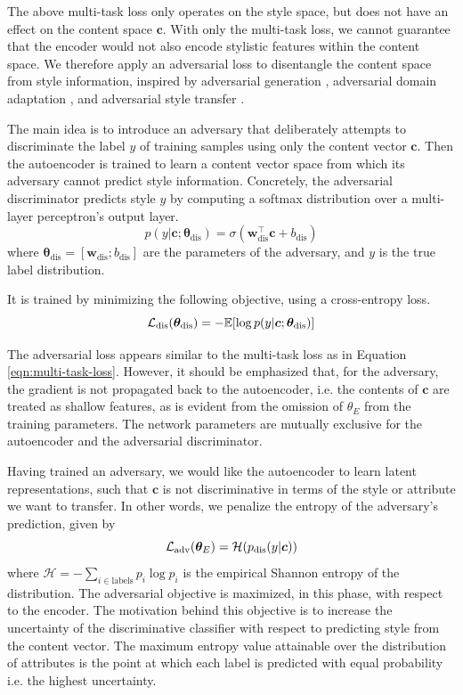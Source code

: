 The above multi-task loss only operates on the style space, but does not have an effect on the content space $\bm c$. With only the multi-task loss, we cannot guarantee that the encoder would not also encode stylistic features within the content space. We therefore apply an adversarial loss to disentangle the content space from style information, inspired by adversarial generation \citep{goodfellow2014generative}, adversarial domain adaptation \citep{liu2017adversarial}, and adversarial style transfer \citep{fu2017style}.

The main idea is to introduce an adversary that deliberately attempts to discriminate the label $y$ of training samples using only the content vector $\bm c$. Then the autoencoder is trained to learn a content vector space from which its adversary cannot predict style information. Concretely, the adversarial discriminator predicts style $y$ by computing a softmax distribution over a multi-layer perceptron's output layer.
\begin{equation}
	p(y | \bm c; \bm\theta_\text{dis}) = \sigma(\bm w_\text{dis}^\top \bm c + b_\text{dis})
\end{equation}
where $\bm\theta_\text{dis}=[\bm w_\text{dis}; b_\text{dis}]$ are the parameters of the adversary, and $y$ is the true label distribution.

It is trained by minimizing the following objective, using a cross-entropy loss.
\begin{equation} \label{eqn:adv-disc-loss}
	\mathcal{L}_\text{dis}(\bm\theta_\text{dis}) =
	- \mathbb{E} [\log p(y | \bm c; \bm\theta_\text{dis})]
\end{equation}

The adversarial loss appears similar to the multi-task loss as in Equation \ref{eqn:multi-task-loss}. However, it should be emphasized that, for the adversary, the gradient is not propagated back to the autoencoder, i.e. the contents of $\bm c$ are treated as shallow features, as is evident from the omission of $\theta_{E}$ from the training parameters. The network parameters are mutually exclusive for the autoencoder and the adversarial discriminator.

Having trained an adversary, we would like the autoencoder to learn latent representations, such that $\bm c$ is not discriminative in terms of the style or attribute we want to transfer. In other words, we penalize the entropy of the adversary's prediction, given by
\begin{equation}
	\mathcal{L}_\text{adv}(\bm\theta_E) = \mathcal{H}(p_\text{dis}(y | \bm c))
\end{equation}
where $\mathcal{H}=-\sum_{i\in\text{labels}} p_i\log p_i$ is the empirical Shannon entropy of the distribution. The adversarial objective is maximized, in this phase, with respect to the encoder. The motivation behind this objective is to increase the uncertainty of the discriminative classifier with respect to predicting style from the content vector. The maximum entropy value attainable over the distribution of attributes is the point at which each label is predicted with equal probability i.e. the highest uncertainty.


